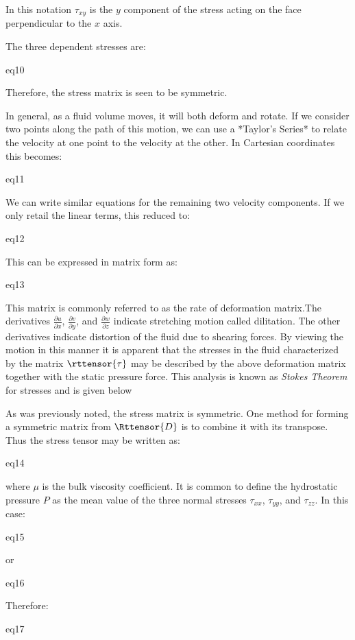 In this notation $\tau_{xy}$ is the $y$ component of the stress acting on the
face perpendicular to the $x$ axis.

The three dependent stresses are:

{eq10}

Therefore, the stress matrix is seen to be symmetric.

In general, as a fluid volume moves, it will both deform and rotate. If we
consider two points along the path of this motion, we can use a *Taylor's
Series* to relate the velocity at one point to the velocity at the other. In
Cartesian coordinates this becomes:

{eq11}

We can write similar equations for the remaining two velocity components. If we only retail the linear terms, this reduced to:

{eq12}

This can be expressed in matrix form as:

{eq13}

This matrix is commonly referred to as the rate of deformation matrix.The
derivatives $\frac{\partial{u}}{\partial{x}}$,
$\frac{\partial{v}}{\partial{y}}$, and $\frac{\partial{w}}{\partial{z}}$
indicate stretching motion called dilitation. The other derivatives indicate
distortion of the fluid due to shearing forces. By viewing the motion in this
manner it is apparent that the stresses in the fluid characterized by the
matrix $\rttensor{\tau}$ may be described by the above deformation matrix
together with the static pressure force. This analysis is known as {\it Stokes
Theorem} for stresses and is given below

As was previously noted, the stress matrix is symmetric. One method for forming
a symmetric matrix from $\Rttensor{D}$ is to combine it with its transpose. Thus
the stress tensor may be written as:

{eq14}

where $\mu$ is the bulk viscosity coefficient. It is common to define the
hydrostatic pressure $P$ as the mean value of the three normal stresses
$\tau_{xx}$, $\tau_{yy}$, and $\tau_{zz}$. In this case:

{eq15}

or

{eq16}

Therefore:

{eq17}

